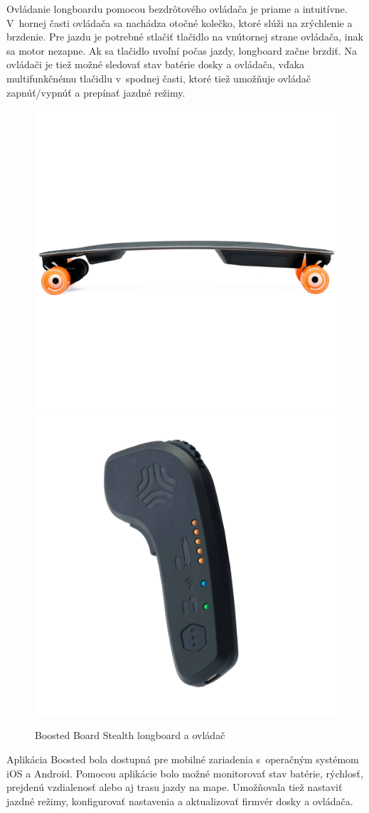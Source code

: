 Ovládanie longboardu pomocou bezdrôtového ovládača je priame a intuitívne.
V~hornej časti ovládača sa nachádza otočné kolečko, ktoré slúži na zrýchlenie a brzdenie.
Pre jazdu je potrebné stlačiť tlačidlo na vnútornej strane ovládača, inak sa motor nezapne.
Ak sa tlačidlo uvoľní počas jazdy, longboard začne brzdiť.
Na ovládači je tiež možné sledovať stav batérie dosky a ovládača, vďaka multifunkčnému tlačidlu v~spodnej časti, ktoré tiež umožňuje ovládač zapnúť/vypnúť a prepínať jazdné režimy.\cite{BoostedManual}

\begin{figure}[h]
    \centering
    \includegraphics[width=0.48\linewidth]{figures/brand-reviews/boosted-longboard.png}\hfill
    \includegraphics[width=0.48\linewidth]{figures/brand-reviews/boosted-controller.png}
    \caption{Boosted Board Stealth longboard a ovládač\cite{BoostedGuys}}\label{fig:boosted}
\end{figure}

Aplikácia Boosted bola dostupná pre mobilné zariadenia s~operačným systémom iOS a Android.
Pomocou aplikácie bolo možné monitorovať stav batérie, rýchlosť, prejdenú vzdialenosť alebo aj trasu jazdy na mape.
Umožňovala tiež nastaviť jazdné režimy, konfigurovať nastavenia a aktualizovať firmvér dosky a ovládača.\cite{BoostedApp}


